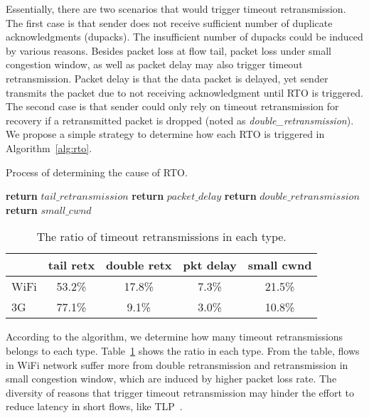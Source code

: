 Essentially, there are two scenarios that would trigger timeout retransmission. The first case is that sender does not receive sufficient number of duplicate acknowledgments (dupacks). The insufficient number of dupacks could be induced by various reasons. Besides packet loss at flow tail, packet loss under small congestion window, as well as packet delay may also trigger timeout retransmission. Packet delay is that the data packet is delayed, yet sender transmits the packet due to not receiving acknowledgment until RTO is triggered. The second case is that sender could only rely on timeout retransmission for recovery if a retransmitted packet is dropped (noted as \emph{double\_retransmission}). We propose a simple strategy to determine how each RTO is triggered in Algorithm~\ref{alg:rto}.

\begin{algorithm}
	\caption{Process of determining the cause of RTO.}
	\label{alg:rto}
	\begin{algorithmic}[1]
				\State \textbf{return} $ tail\_retransmission$
				\State \textbf{return} $ packet\_delay$
				\State \textbf{return} $ double\_retransmission$
			\Else
				\State \textbf{return} $ small\_cwnd$
			\EndIf
		\EndProcedure
	\end{algorithmic}
\end{algorithm}

\begin{table}[th]
\caption{The ratio of timeout retransmissions in each type.}
\label{tab:rto_type}
\centering
\renewcommand{\arraystretch}{1.1}
\begin{tabular}{l|c|c|c|c}
\toprule
& tail retx & double retx & pkt delay & small cwnd \\
\midrule
WiFi & 53.2\% & 17.8\% & 7.3\% & 21.5\% \\
\hline
3G & 77.1\% & 9.1\% & 3.0\% & 10.8\% \\
\bottomrule
\end{tabular}
\end{table}

According to the algorithm, we determine how many timeout retransmissions belongs to each type. Table~\ref{tab:rto_type} shows the ratio in each type. From the table, flows in WiFi network suffer more from double retransmission and retransmission in small congestion window, which are induced by higher packet loss rate. The diversity of reasons that trigger timeout retransmission may hinder the effort to reduce latency in short flows, like TLP~\cite{flach2013reducing}.


